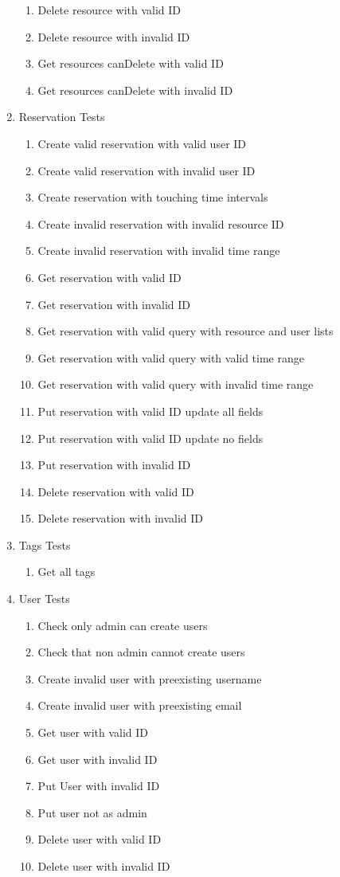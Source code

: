 \documentclass[12pt]{article}
\begin{document}
\begin{enumerate}
\begin{enumerate}
		\item Delete resource with valid ID
		\item Delete resource with invalid ID
		\item Get resources canDelete with valid ID
		\item Get resources canDelete with invalid ID
	\end{enumerate}
	\item Reservation Tests
	\begin{enumerate}
		\item Create valid reservation with valid user ID
		\item Create valid reservation with invalid user ID
		\item Create reservation with touching time intervals
		\item Create invalid reservation with invalid resource ID
		\item Create invalid reservation with invalid time range
		\item Get reservation with valid ID
		\item Get reservation with invalid ID
		\item Get reservation with valid query with resource and user lists
		\item Get reservation with valid query with valid time range
		\item Get reservation with valid query with invalid time range
		\item Put reservation with valid ID update all fields
		\item Put reservation with valid ID update no fields
		\item Put reservation with invalid ID
		\item Delete reservation with valid ID
		\item Delete reservation with invalid ID
	\end{enumerate}
	\item Tags Tests
	\begin{enumerate}
		\item Get all tags
	\end{enumerate}
	\item User Tests
	\begin{enumerate}
		\item Check only admin can create users
		\item Check that non admin cannot create users
		\item Create invalid user with preexisting username
		\item Create invalid user with preexisting email 
		\item Get user with valid ID
		\item Get user with invalid ID
		\item Put User with invalid ID
		\item Put user not as admin
		\item Delete user with valid ID
		\item Delete user with invalid ID
	\end{enumerate}
\end{enumerate}
\end{document}
